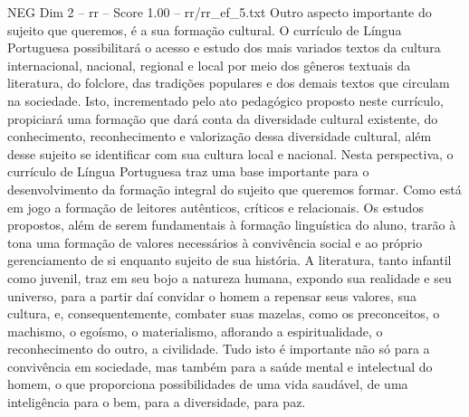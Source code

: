\begin{textsample}{NEG Dim 2 – rr – Score 1.00 – rr/rr\_ef\_5.txt}
Outro aspecto importante do sujeito que queremos, é a sua formação cultural.
O currículo de Língua Portuguesa possibilitará o acesso e estudo dos mais variados textos da cultura internacional, nacional, regional e local por meio dos gêneros textuais da literatura, do folclore, das tradições populares e dos demais textos que circulam na sociedade.
Isto, incrementado pelo ato pedagógico proposto neste currículo, propiciará uma formação que dará conta da diversidade cultural existente, do conhecimento, reconhecimento e valorização dessa diversidade cultural, além desse sujeito se identificar com sua cultura local e nacional.
Nesta perspectiva, o currículo de Língua Portuguesa traz uma base importante para o desenvolvimento da formação integral do sujeito que queremos formar.
Como está em jogo a formação de leitores autênticos, críticos e relacionais.
Os estudos propostos, além de serem fundamentais à formação linguística do aluno, trarão à tona uma formação de valores necessários à convivência social e ao próprio gerenciamento de si enquanto sujeito de sua história.
A literatura, tanto infantil como juvenil, traz em seu bojo a natureza humana, expondo sua realidade e seu universo, para a partir daí convidar o homem a repensar seus valores, sua cultura, e, consequentemente, combater suas mazelas, como os preconceitos, o machismo, o egoísmo, o materialismo, aflorando a espiritualidade, o reconhecimento do outro, a civilidade.
Tudo isto é importante não só para a convivência em sociedade, mas também para a saúde mental e intelectual do homem, o que proporciona possibilidades de uma vida saudável, de uma inteligência para o bem, para a diversidade, para paz.

\end{textsample}
